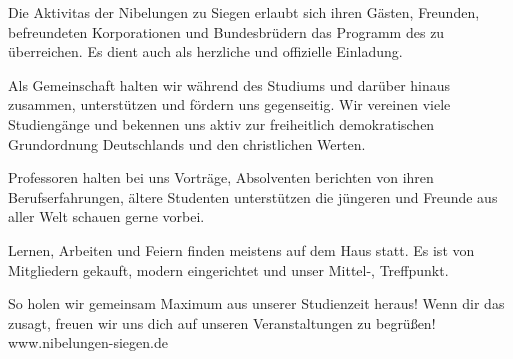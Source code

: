	\addPage 
	{}
	{\false}
	{}
	{}
	{\SeiteZweiTitel}
	{
		Die Aktivitas der Nibelungen zu Siegen erlaubt sich ihren Gästen, Freunden, befreundeten Korporationen und Bundesbrüdern das Programm des \couleursemester zu überreichen. Es dient auch als herzliche und offizielle Einladung. \par
		Als Gemeinschaft halten wir während des Studiums und darüber hinaus zusammen, unterstützen und fördern uns gegenseitig. Wir vereinen viele Studiengänge und bekennen uns aktiv zur freiheitlich demokratischen Grundordnung Deutschlands und den christlichen Werten.\par 
		Professoren halten bei uns Vorträge, Absolventen berichten von ihren Berufserfahrungen, ältere Studenten unterstützen die jüngeren und Freunde aus aller Welt schauen gerne vorbei.\par
		Lernen, Arbeiten und Feiern finden meistens auf dem Haus statt. Es ist von Mitgliedern gekauft, modern eingerichtet und unser Mittel-, Treffpunkt.\par
		So holen wir gemeinsam Maximum aus unserer Studienzeit heraus! Wenn dir das zusagt, freuen wir uns dich auf unseren Veranstaltungen zu begrüßen!
		\vfill
		www.nibelungen-siegen.de
	}